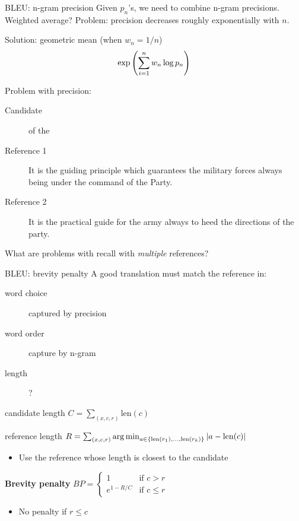 \documentclass[usenames,dvipsnames,11pt,aspectratio=169]{beamer}
\newcommand{\pdfnote}[1]{}
\begin{document}
\begin{frame}
    {BLEU: n-gram precision}
    Given $p_n$'s, we need to combine n-gram precisions.\\
    Weighted average? Problem: precision decreases roughly exponentially with $n$.

    Solution: geometric mean (when $w_n=1/n$)
    $$
    \exp\left( \sum_{i=1}^n w_n \log p_n \right)
    $$

    Problem with precision:\\
    \begin{description}
        \item[Candidate] of the 
        \item[Reference 1] It is the guiding principle which guarantees the military forces always being under the command of the Party. 
        \item[Reference 2] It is the practical guide for the army always to heed the directions of the party.
    \end{description}

    What are problems with recall with \textit{multiple} references?
    \pdfnote{
       BLEU does not use recall because the notion of recall is unclear when simultaneously matching against multiple reference translations (rather than a single reference).  
    }
\end{frame}

\begin{frame}
    {BLEU: brevity penalty}
    A good translation must match the reference in:\\
    \begin{description}
        \item[word choice] captured by precision
        \item[word order] capture by n-gram
        \item[length] ?
    \end{description}

    {candidate length} $C=\sum_{(x,c,r)} \text{len}(c)$

    {reference length} $R=\sum_{(x,c,r)} \operatorname*{arg\,min}_{a\in\left\{ \text{len}(r_1),\ldots,\text{len}(r_k) \right\}} |a-\text{len}(c)|$\\
    \begin{itemize}
        \item Use the reference whose length is closest to the candidate
    \end{itemize}

    \textbf{Brevity penalty} $BP =
    \begin{cases}
    1 & \text{if } c > r \\
        e^{1-R/C} & \text{if } c \le r
    \end{cases}
    $
    \begin{itemize}
        \item No penalty if $r\le c$
    \end{itemize}
\end{frame}
\end{document}
